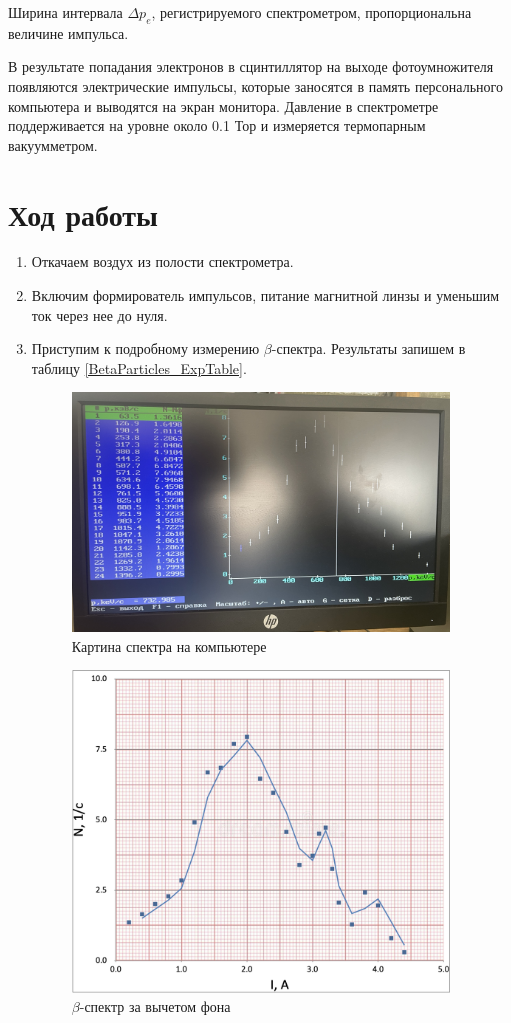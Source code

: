 \documentclass[12pt,a4paper]{article}
\begin{document}
	Ширина интервала $\Delta p_e$, регистрируемого спектрометром, пропорциональна величине импульса.
	
	В результате попадания электронов в сцинтиллятор на выходе фотоумножителя появляются электрические импульсы, которые заносятся в память персонального компьютера и выводятся на экран монитора. Давление в спектрометре поддерживается на уровне около 0.1 Тор и измеряется термопарным вакуумметром.
	
	
    \section*{Ход работы}
	
    \begin{enumerate}
		\item Откачаем воздух из полости спектрометра.
		
		\item Включим формирователь импульсов, питание магнитной линзы и уменьшим ток через нее до нуля.
		
		\item Приступим к подробному измерению $\beta$-спектра. Результаты запишем в таблицу \ref{BetaParticles_ExpTable}.
		\begin{figure}[h!]
			\centering
			\includegraphics[width=10cm]{src/CompSpectre.jpg}
			\caption{Картина спектра на компьютере}
		\end{figure}
	
		\begin{figure}[h!]
			\centering
			\includegraphics[width=10cm]{src/Spectre.png}
			\caption{$\beta$-спектр за вычетом фона}
		\end{figure}
		

\end{enumerate}
\end{document}
